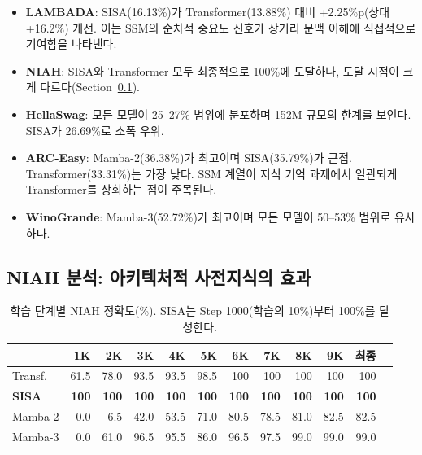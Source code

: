 \documentclass[11pt]{article}
\begin{document}
\begin{itemize}[leftmargin=*]
\item \textbf{LAMBADA}: SISA(16.13\%)가 Transformer(13.88\%) 대비 +2.25\%p(상대 +16.2\%) 개선. 이는 SSM의 순차적 중요도 신호가 장거리 문맥 이해에 직접적으로 기여함을 나타낸다.

\item \textbf{NIAH}: SISA와 Transformer 모두 최종적으로 100\%에 도달하나, 도달 시점이 크게 다르다(Section~\ref{sec:niah_analysis}).

\item \textbf{HellaSwag}: 모든 모델이 25--27\% 범위에 분포하며 152M 규모의 한계를 보인다. SISA가 26.69\%로 소폭 우위.

\item \textbf{ARC-Easy}: Mamba-2(36.38\%)가 최고이며 SISA(35.79\%)가 근접. Transformer(33.31\%)는 가장 낮다. SSM 계열이 지식 기억 과제에서 일관되게 Transformer를 상회하는 점이 주목된다.

\item \textbf{WinoGrande}: Mamba-3(52.72\%)가 최고이며 모든 모델이 50--53\% 범위로 유사하다.
\end{itemize}

\subsection{NIAH 분석: 아키텍처적 사전지식의 효과}
\label{sec:niah_analysis}

\begin{table}[h]
\centering
\caption{학습 단계별 NIAH 정확도(\%). SISA는 Step 1000(학습의 10\%)부터 100\%를 달성한다.}
\label{tab:niah_detail}
\begin{tabular}{lrrrrrrrrrrr}
\toprule
& \textbf{1K} & \textbf{2K} & \textbf{3K} & \textbf{4K} & \textbf{5K} & \textbf{6K} & \textbf{7K} & \textbf{8K} & \textbf{9K} & \textbf{최종} \\
\midrule
Transf. & 61.5 & 78.0 & 93.5 & 93.5 & 98.5 & 100 & 100 & 100 & 100 & 100 \\
\textbf{SISA} & \textbf{100} & \textbf{100} & \textbf{100} & \textbf{100} & \textbf{100} & \textbf{100} & \textbf{100} & \textbf{100} & \textbf{100} & \textbf{100} \\
Mamba-2 & 0.0 & 6.5 & 42.0 & 53.5 & 71.0 & 80.5 & 78.5 & 81.0 & 82.5 & 82.5 \\
Mamba-3 & 0.0 & 61.0 & 96.5 & 95.5 & 86.0 & 96.5 & 97.5 & 99.0 & 99.0 & 99.0 \\
\bottomrule
\end{tabular}
\end{table}
\end{document}
